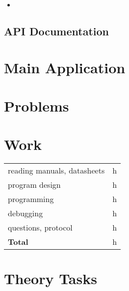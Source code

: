 \documentclass[12pt,a4paper,titlepage,oneside]{article}
\begin{document}
\begin{itemize}

 \item
 
\end{itemize}



\subsection{API Documentation}


\section{Main Application}


\section{Problems}


\section{Work}

\begin{tabular}{|l|c|}
\hline
reading manuals, datasheets	&  h	\\
program design			&  h	\\
programming			&  h	\\
debugging			&  h	\\
questions, protocol		&  h	\\
\hline
{\bf Total}			&  h	\\
\hline
\end{tabular}



\section{Theory Tasks}
\end{document}
